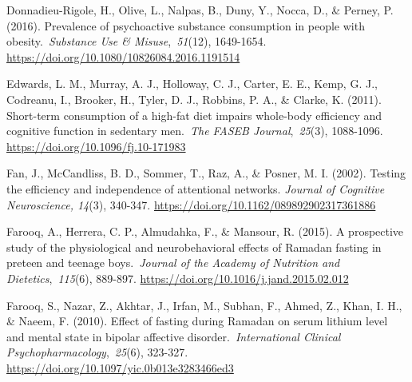 \documentclass[authordate, empirical]{jote-new-article}
\begin{document}
Donnadieu-Rigole, H., Olive, L., Nalpas, B., Duny, Y., Nocca, D., \& Perney, P. (2016). Prevalence of psychoactive substance consumption in people with obesity. \emph{Substance Use \& Misuse}, \emph{51}(12), 1649-1654. \url{https://doi.org/10.1080/10826084.2016.1191514}



Edwards, L. M., Murray, A. J., Holloway, C. J., Carter, E. E., Kemp, G. J., Codreanu, I., Brooker, H., Tyler, D. J., Robbins, P. A., \& Clarke, K. (2011). Short-term consumption of a high-fat diet impairs whole-body efficiency and cognitive function in sedentary men. \emph{The FASEB Journal}, \emph{25}(3), 1088-1096. \url{https://doi.org/10.1096/fj.10-171983}






Fan, J., McCandliss, B. D., Sommer, T., Raz, A., \& Posner, M. I. (2002). Testing the efficiency and independence of attentional networks. \emph{Journal of Cognitive Neuroscience, 14}(3), 340-347. \url{https://doi.org/10.1162/089892902317361886}






Farooq, A., Herrera, C. P., Almudahka, F., \& Mansour, R. (2015). A prospective study of the physiological and neurobehavioral effects of Ramadan fasting in preteen and teenage boys. \emph{Journal of the Academy of Nutrition and Dietetics}, \emph{115}(6), 889-897. \url{https://doi.org/10.1016/j.jand.2015.02.012}



Farooq, S., Nazar, Z., Akhtar, J., Irfan, M., Subhan, F., Ahmed, Z., Khan, I. H., \& Naeem, F. (2010). Effect of fasting during Ramadan on serum lithium level and mental state in bipolar affective disorder. \emph{International Clinical Psychopharmacology}, \emph{25}(6), 323-327. \url{https://doi.org/10.1097/yic.0b013e3283466ed3}
\end{document}
